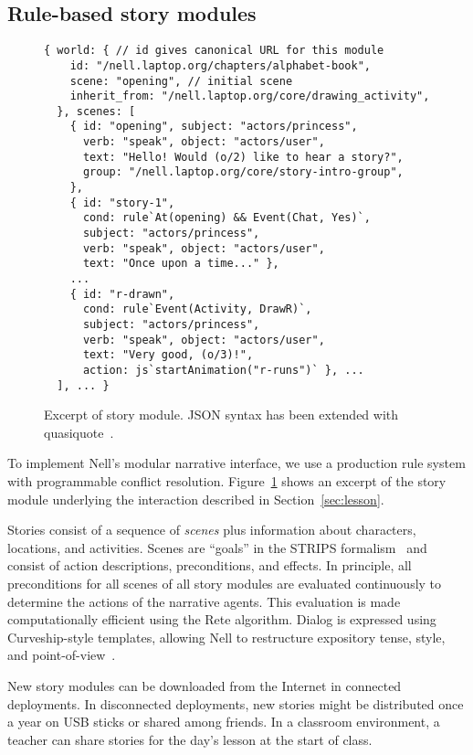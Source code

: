 \documentclass[preprint]{sig-alternate}
\begin{document}
\subsection{Rule-based story modules}
\begin{figure}\small
\begin{verbatim}
{ world: { // id gives canonical URL for this module
    id: "/nell.laptop.org/chapters/alphabet-book",
    scene: "opening", // initial scene
    inherit_from: "/nell.laptop.org/core/drawing_activity",
  }, scenes: [
    { id: "opening", subject: "actors/princess",
      verb: "speak", object: "actors/user",
      text: "Hello! Would (o/2) like to hear a story?",
      group: "/nell.laptop.org/core/story-intro-group",
    },
    { id: "story-1",
      cond: rule`At(opening) && Event(Chat, Yes)`,
      subject: "actors/princess",
      verb: "speak", object: "actors/user",
      text: "Once upon a time..." },
    ...
    { id: "r-drawn",
      cond: rule`Event(Activity, DrawR)`,
      subject: "actors/princess",
      verb: "speak", object: "actors/user",
      text: "Very good, (o/3)!",
      action: js`startAnimation("r-runs")` }, ...
  ], ... }
\end{verbatim}
\caption{Excerpt of story module.  JSON syntax has been extended with
quasiquote~\cite{quasiquote}.}\label{fig:rules}
\end{figure}
To implement Nell's modular narrative interface, we use a
production rule system with programmable conflict resolution.
Figure~\ref{fig:rules} shows
an excerpt of the story module underlying the interaction described in
Section~\ref{sec:lesson}.

Stories consist of a sequence of \textit{scenes} plus information about
characters, locations, and activities.  Scenes are ``goals''
in the STRIPS formalism~\cite{strips} and consist of
action descriptions, preconditions, and effects.
In principle, all preconditions for all scenes of all story modules
are evaluated continuously to determine the actions of the narrative
agents.  This evaluation
is made computationally efficient using the Rete
algorithm.  Dialog is expressed using Curveship-style
templates, allowing Nell to restructure
expository tense, style, and point-of-view~\cite{montfort:curveship}.


New story modules can be downloaded from the Internet in
connected deployments.  In disconnected deployments, new stories
might be distributed once a year on USB sticks or shared among
friends.  In a classroom environment, a teacher can share stories for
the day's lesson at the start of class.
\end{document}
